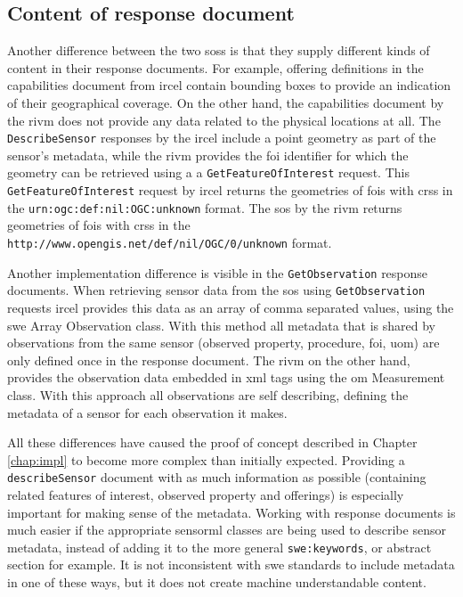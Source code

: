 \subsection{Content of response document}
\begin{sloppypar}
Another difference between the two \aclp{sos} is that they supply different kinds of content in their response documents. For example, offering definitions in the capabilities document from \ac{ircel} contain bounding boxes to provide an indication of their geographical coverage. On the other hand, the capabilities document by the \ac{rivm} does not provide any data related to the physical locations at all. The \texttt{DescribeSensor} responses by the \ac{ircel} include a point geometry as part of the sensor's metadata, while the \ac{rivm} provides the \ac{foi} identifier for which the geometry can be retrieved using a a \texttt{GetFeatureOfInterest} request. This \texttt{GetFeatureOfInterest} request by \ac{ircel} returns the geometries of \acp{foi} with \acp{crs} in the \texttt{urn:ogc:def:nil:OGC:unknown} format. The \ac{sos} by the \ac{rivm} returns geometries of \acp{foi} with \acp{crs} in the \texttt{http://www.opengis.net/def/nil/OGC/0/unknown} format. 
\end{sloppypar}

\begin{sloppypar}
Another implementation difference is visible in the \texttt{GetObservation} response documents. When retrieving sensor data from the \ac{sos} using \texttt{GetObservation} requests \ac{ircel} provides this data as an array of comma separated values, using the \ac{swe} Array Observation class. With this method all metadata that is shared by observations from the same sensor (observed property, procedure, \ac{foi}, \ac{uom}) are only defined once in the response document. The \ac{rivm} on the other hand, provides the observation data embedded in \ac{xml} tags using the \ac{om} Measurement class. With this approach all observations are self describing, defining the metadata of a sensor for each observation it makes.   
\end{sloppypar}

All these differences have caused the proof of concept described in Chapter \ref{chap:impl} to become more complex than initially expected. Providing a \texttt{describeSensor} document with as much information as possible (containing related features of interest, observed property and offerings) is especially important for making sense of the metadata. Working with response documents is much easier if the appropriate \ac{sensorml} classes are being used to describe sensor metadata, instead of adding it to the more general \texttt{swe:keywords}, or abstract section for example. It is not inconsistent with \ac{swe} standards to include metadata in one of these ways, but it does not create machine understandable content. 

